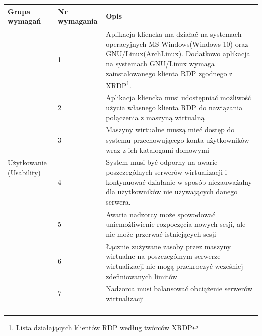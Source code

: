 \documentclass[12pt]{article}
\begin{document}
\begin{center}
	\begin{table}[h!]
		\begin{tabular}{|p{}|p{}|p{}|}
			\hline Grupa wymagań                            & Nr wymagania & Opis                                                                                                                                                                    \\ \hline
			\multirow[t]{8}{=}{Użytkowanie (Usability)}     & 1            & Aplikacja kliencka ma działać na systemach operacyjnych MS Windows(Windows 10) oraz GNU/Linux(ArchLinux). Dodatkowo aplikacja na systemach GNU/Linux wymaga zainstalowanego klienta RDP zgodnego z XRDP\footnote{\href{https://github.com/neutrinolabs/xrdp\#overview}{Lista działających klientów RDP według twórców XRDP}}.                                                                                      \\ \cline{2-3}
			                                                & 2            & Aplikacja kliencka musi udostępniać możliwość użycia własnego klienta RDP do nawiązania połączenia z maszyną wirtualną                                                  \\ \cline{2-3}
			                                                & 3            & Maszyny wirtualne muszą mieć dostęp do systemu przechowującego konta użytkowników wraz z ich katalogami domowymi                                                        \\ \hline
			\multirow[t]{7}{=}{Niezawodność (Reliability)}  & 4            & System musi być odporny na awarie poszczególnych serwerów wirtualizacji i kontynuować działanie w sposób niezauważalny dla użytkowników nie używających danego serwera. \\ \cline{2-3}
			                                                & 5            & Awaria nadzorcy może spowodować uniemożliwienie rozpoczęcia nowych sesji, ale nie może przerwać istniejących sesji                                                      \\ \hline
			\multirow[t]{10}{=}{Wydajność (Performance)}    & 6            & Łącznie zużywane zasoby przez maszyny wirtualne na poszczególnym serwerze wirtualizacji nie mogą przekroczyć wcześniej zdefiniowanych limitów                           \\ \cline{2-3}
			                                                & 7            & Nadzorca musi balansować obciążenie serwerów wirtualizacji                                                                                                              \\ \cline{2-3}

\end{tabular}
\end{table}
\end{center}
\end{document}
